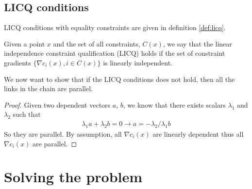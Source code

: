 \subsection{LICQ conditions}
LICQ conditions with equality constraints are given in definition \ref{def:licq}. 
\begin{definition} \cite{LICQ} \label{def:licq}
Given a point $x$ and the set of all constraints, $C(x)$, we say that the linear independence constraint qualification (LICQ) holds if the set of constraint gradients $\{\nabla c_i(x), i \in C(x)\}$ is linearly independent.
\end{definition}
We now want to show that if the LICQ conditions does not hold, then all the links in the chain are parallel.
\begin{proof}

Given two dependent vectors $a$, $b$, we know that there exists scalars $\lambda_1$ and $\lambda_2$ such that
\begin{align*}
\lambda_1 a+\lambda_2 b = 0  \rightarrow a = -\lambda_2/\lambda_1 b
\end{align*}
So they are parallel. By assumption, all $\nabla c_i(x)$ are linearly dependent thus all $ \nabla c_i(x)$ are parallel.
\end{proof}

\section{Solving the problem}
